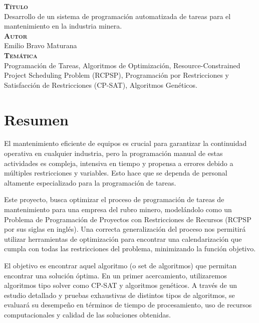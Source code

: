 \documentclass{article}
\begin{document}
{\bfseries\scshape Título}\\[.25cm]
Desarrollo de un sistema de programación automatizada de tareas para el mantenimiento en la industria minera.\\


{\bfseries\scshape Autor}\\[.25cm]
Emilio Bravo Maturana\\

{\bfseries\scshape Temática}\\[.25cm]
Programación de Tareas, Algoritmos de Optimización, Resource-Constrained Project Scheduling Problem (RCPSP), Programación por Restricciones y Satisfacción de Restricciones (CP-SAT), Algoritmos Genéticos. 

\newpage

\section*{Resumen}
El mantenimiento eficiente de equipos es crucial para garantizar la continuidad operativa en cualquier industria, pero la programación manual de estas actividades es compleja, intensiva en tiempo y propensa a errores debido a múltiples restricciones y variables. Esto hace que se dependa de personal altamente especializado para la programación de tareas.

Este proyecto, busca optimizar el proceso de programación de tareas de mantenimiento para una empresa del rubro minero, modelándolo como un Problema de Programación de Proyectos con Restricciones de Recursos (RCPSP por sus siglas en inglés). Una correcta generalización del proceso nos permitirá utilizar herramientas de optimización para encontrar una calendarización que cumpla con todas las restricciones del problema, minimizando la función objetivo.

El objetivo es encontrar aquel algoritmo (o set de algoritmos) que permitan encontrar una solución óptima. En un primer acercamiento, utilizaremos algoritmos tipo solver como CP-SAT y algoritmos genéticos. A través de un estudio detallado y pruebas exhaustivas de distintos tipos de algoritmos, se evaluará su desempeño en términos de tiempo de procesamiento, uso de recursos computacionales y calidad de las soluciones obtenidas.

\newpage

\tableofcontents
\newpage
\end{document}
